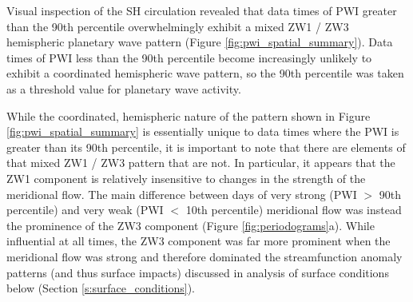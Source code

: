 Visual inspection of the SH circulation revealed that data times of PWI greater than the 90th percentile overwhelmingly exhibit a mixed ZW1 / ZW3 hemispheric planetary wave pattern (Figure \ref{fig:pwi_spatial_summary}). Data times of PWI less than the 90th percentile become increasingly unlikely to exhibit a coordinated hemispheric wave pattern, so the 90th percentile was taken as a threshold value for planetary wave activity. 

While the coordinated, hemispheric nature of the pattern shown in Figure \ref{fig:pwi_spatial_summary} is essentially unique to data times where the PWI is greater than its 90th percentile, it is important to note that there are elements of that mixed ZW1 / ZW3 pattern that are not. In particular, it appears that the ZW1 component is relatively insensitive to changes in the strength of the meridional flow. The main difference between days of very strong (PWI $>$ 90th percentile) and very weak (PWI $<$ 10th percentile) meridional flow was instead the prominence of the ZW3 component (Figure \ref{fig:periodograms}a). While influential at all times, the ZW3 component was far more prominent when the meridional flow was strong and therefore dominated the streamfunction anomaly patterns (and thus surface impacts) discussed in analysis of surface conditions below (Section \ref{s:surface_conditions}). 

